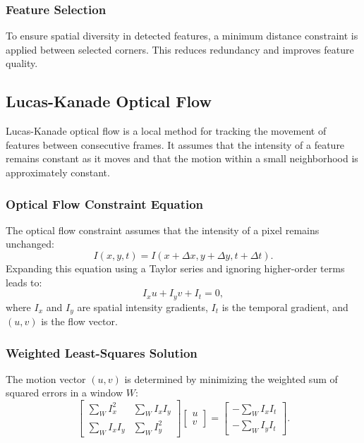 \documentclass[11pt, conference, letterpaper]{IEEEtran}
\begin{document}
\subsubsection{Feature Selection}
To ensure spatial diversity in detected features, a minimum distance constraint is applied between selected corners. This reduces redundancy and improves feature quality.

\subsection{Lucas-Kanade Optical Flow}
Lucas-Kanade optical flow is a local method for tracking the movement of features between consecutive frames. It assumes that the intensity of a feature remains constant as it moves and that the motion within a small neighborhood is approximately constant.

\subsubsection{Optical Flow Constraint Equation}
The optical flow constraint assumes that the intensity of a pixel remains unchanged:
\begin{equation}
I(x, y, t) = I(x + \Delta x, y + \Delta y, t + \Delta t).
\end{equation}
Expanding this equation using a Taylor series and ignoring higher-order terms leads to:
\begin{equation}
I_x u + I_y v + I_t = 0,
\end{equation}
where \(I_x\) and \(I_y\) are spatial intensity gradients, \(I_t\) is the temporal gradient, and \((u, v)\) is the flow vector.

\subsubsection{Weighted Least-Squares Solution}
The motion vector \((u, v)\) is determined by minimizing the weighted sum of squared errors in a window \(W\):
\begin{equation}
\begin{bmatrix}
\sum_W I_x^2 & \sum_W I_x I_y \\
\sum_W I_x I_y & \sum_W I_y^2
\end{bmatrix}
\begin{bmatrix}
u \\
v
\end{bmatrix}
=
\begin{bmatrix}
-\sum_W I_x I_t \\
-\sum_W I_y I_t
\end{bmatrix}.
\end{equation}
\end{document}
